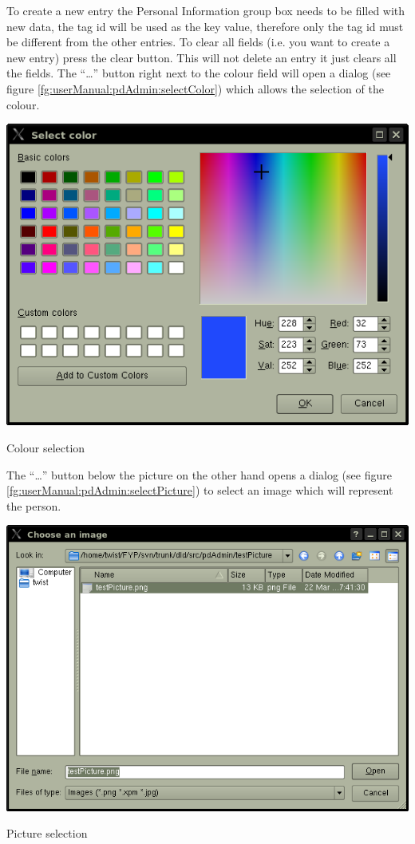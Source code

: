   To create a new entry the Personal Information group box needs to be filled with new data, the tag id will be used as the key value, therefore only the tag id must be different from the other entries. To clear all fields (i.e. you want to create a new entry) press the clear button. This will not delete an entry it just clears all the fields. The ``\dots'' button right next to the colour field will open a dialog (see figure \ref{fg:userManual:pdAdmin:selectColor}) which allows the selection of the colour.
  \begin{staticFigure}
   \begin{center}
     \includegraphics{images/UserManual/pdAdmin/selectColorDialog.png}
     \caption{Colour selection}
     \label{fg:userManual:pdAdmin:selectColor}
   \end{center}
  \end{staticFigure}
  The ``\dots'' button below the picture on the other hand opens a dialog (see figure \ref{fg:userManual:pdAdmin:selectPicture}) to select an image which will represent the person.
  \begin{staticFigure}
   \begin{center}
     \includegraphics[scale=0.8]{images/UserManual/pdAdmin/choosePictureDialog.png}
     \caption{Picture selection}
     \label{fg:userManual:pdAdmin:selectPicture}
   \end{center}
  \end{staticFigure}

